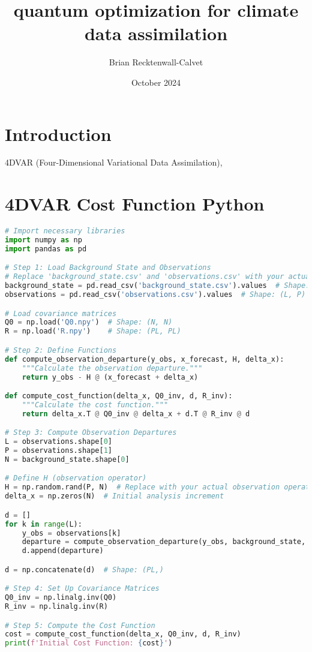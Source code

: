 \documentclass{article}
\title{quantum optimization for climate data assimilation}
\author{Brian Recktenwall-Calvet}
\date{October 2024}
\begin{document}
\maketitle

\section{Introduction}

4DVAR (Four-Dimensional Variational Data Assimilation), 


\section{4DVAR Cost Function Python}
\begin{lstlisting}[language=Python]
# Import necessary libraries
import numpy as np
import pandas as pd

# Step 1: Load Background State and Observations
# Replace 'background_state.csv' and 'observations.csv' with your actual file paths
background_state = pd.read_csv('background_state.csv').values  # Shape: (N,)
observations = pd.read_csv('observations.csv').values  # Shape: (L, P)

# Load covariance matrices
Q0 = np.load('Q0.npy')  # Shape: (N, N)
R = np.load('R.npy')    # Shape: (PL, PL)

# Step 2: Define Functions
def compute_observation_departure(y_obs, x_forecast, H, delta_x):
    """Calculate the observation departure."""
    return y_obs - H @ (x_forecast + delta_x)

def compute_cost_function(delta_x, Q0_inv, d, R_inv):
    """Calculate the cost function."""
    return delta_x.T @ Q0_inv @ delta_x + d.T @ R_inv @ d

# Step 3: Compute Observation Departures
L = observations.shape[0]
P = observations.shape[1]
N = background_state.shape[0]

# Define H (observation operator)
H = np.random.rand(P, N)  # Replace with your actual observation operator
delta_x = np.zeros(N)  # Initial analysis increment

d = []
for k in range(L):
    y_obs = observations[k]
    departure = compute_observation_departure(y_obs, background_state, H, delta_x)
    d.append(departure)

d = np.concatenate(d)  # Shape: (PL,)

# Step 4: Set Up Covariance Matrices
Q0_inv = np.linalg.inv(Q0)
R_inv = np.linalg.inv(R)

# Step 5: Compute the Cost Function
cost = compute_cost_function(delta_x, Q0_inv, d, R_inv)
print(f'Initial Cost Function: {cost}')


\end{lstlisting}
\end{document}
